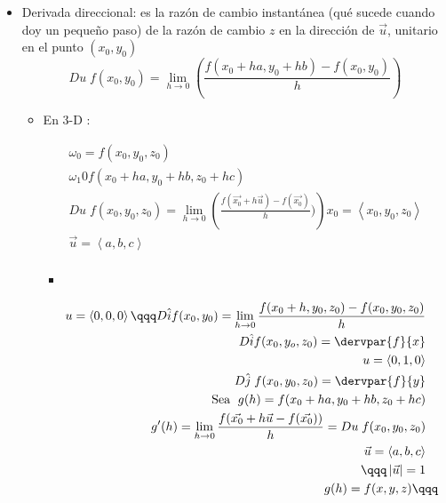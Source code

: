 \begin{itemize}
    \item Derivada direccional: es la razón de cambio instantánea (qué sucede cuando doy un pequeño paso) de la razón de cambio $z$ en la dirección de $\vec{u}$, unitario en el punto $(x_0,y_0)$
        \[
            Du\; f(x_0,y_0) = \lim_{h \to 0} \left(\frac{f(x_0+ha,y_0+hb)-f(x_0,y_0)}{h}\right)
        \]
        \begin{itemize}
            \item En 3-D :
                \begin{center}
                   \begin{align*}
                       \omega_0 = f(x_0,y_0,z_0) \\ 
                       \omega_1 0 f(x_0+ha,y_0+hb,z_0+hc) \\ 
                       Du\; f(x_0,y_0,z_0) = \lim_{h \to 0} \left(\frac{f(\vec{x_0}+h\vec{u})-f(\vec{x_0})}{h} )\right)
                       x_0 = \left\langle x_0,y_0,z_0 \right\rangle \\ 
                       \vec{u} = \left\langle a,b,c \right\rangle \\ 
                   \end{align*}
                   \begin{itemize}
                       \item {} 
                   \end{itemize}
                   \begin{align*}
                       u = \left\langle 0,0,0 \right\rangle  \qqq D\hat{i}f(x_0,y_0) = \lim_{h \to 0} \frac{f(x_0+h,y_0,z_0)-f(x_0,y_0,z_0)}{h} \\ 
                       D\hat{i}f(x_0,y_o,z_0) = \dervpar{f}{x} 
                       \\
                       u = \left\langle 0,1,0 \right\rangle \\ 
                       D\hat{j}\;f(x_0,y_0,z_0) = \dervpar{f}{y} \\ 
                       \text{ Sea }\; g(h) = f(x_0+ha,y_0+hb,z_0+hc) \\ 
                       g'(h) = \lim_{h \to 0} \frac{f(\vec{x_0}+h\vec{u}-f(\vec{x_0}))}{h} = Du\;f(x_0,y_0,z_0) \\ 
                       \vec{u} = \left\langle a,b,c \right\rangle \\ \qqq \left| \vec{u} \right| =1 \\ 
                       g(h) = f(x,y,z) \qqq \begin{matrix}

\end{matrix}
\end{align*}
\end{center}
\end{itemize}
\end{itemize}
